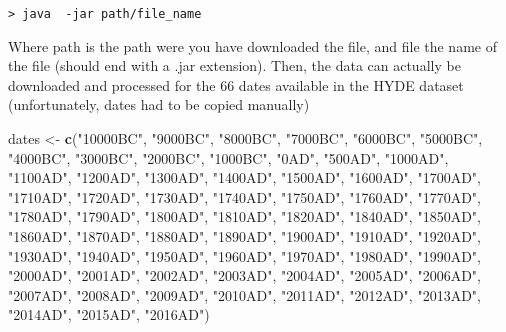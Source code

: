 \documentclass[]{article}
\newenvironment{Shaded}{\begin{snugshade}}{\end{snugshade}}
\newcommand{\KeywordTok}[1]{\textcolor[rgb]{0.13,0.29,0.53}{\textbf{#1}}}
\newcommand{\StringTok}[1]{\textcolor[rgb]{0.31,0.60,0.02}{#1}}
\newcommand{\NormalTok}[1]{#1}
\begin{document}
\texttt{\textgreater{}\ java\ \ -jar\ path/file\_name}

Where path is the path were you have downloaded the file, and file the
name of the file (should end with a .jar extension). Then, the data can
actually be downloaded and processed for the 66 dates available in the
HYDE dataset (unfortunately, dates had to be copied manually)

\begin{Shaded}
\begin{Highlighting}[]
\NormalTok{dates <-}\StringTok{ }\KeywordTok{c}\NormalTok{(}\StringTok{"10000BC"}\NormalTok{, }\StringTok{"9000BC"}\NormalTok{, }\StringTok{"8000BC"}\NormalTok{, }\StringTok{"7000BC"}\NormalTok{, }\StringTok{"6000BC"}\NormalTok{, }\StringTok{"5000BC"}\NormalTok{, }\StringTok{"4000BC"}\NormalTok{, }\StringTok{"3000BC"}\NormalTok{,}
           \StringTok{"2000BC"}\NormalTok{, }\StringTok{"1000BC"}\NormalTok{, }\StringTok{"0AD"}\NormalTok{, }\StringTok{"500AD"}\NormalTok{, }\StringTok{"1000AD"}\NormalTok{, }\StringTok{"1100AD"}\NormalTok{, }\StringTok{"1200AD"}\NormalTok{, }\StringTok{"1300AD"}\NormalTok{, }\StringTok{"1400AD"}\NormalTok{, }
           \StringTok{"1500AD"}\NormalTok{, }\StringTok{"1600AD"}\NormalTok{, }\StringTok{"1700AD"}\NormalTok{, }\StringTok{"1710AD"}\NormalTok{, }\StringTok{"1720AD"}\NormalTok{, }\StringTok{"1730AD"}\NormalTok{,   }\StringTok{"1740AD"}\NormalTok{, }\StringTok{"1750AD"}\NormalTok{, }
           \StringTok{"1760AD"}\NormalTok{, }\StringTok{"1770AD"}\NormalTok{, }\StringTok{"1780AD"}\NormalTok{, }\StringTok{"1790AD"}\NormalTok{, }\StringTok{"1800AD"}\NormalTok{, }\StringTok{"1810AD"}\NormalTok{, }\StringTok{"1820AD"}\NormalTok{, }\StringTok{"1840AD"}\NormalTok{, }
           \StringTok{"1850AD"}\NormalTok{, }\StringTok{"1860AD"}\NormalTok{, }\StringTok{"1870AD"}\NormalTok{, }\StringTok{"1880AD"}\NormalTok{, }\StringTok{"1890AD"}\NormalTok{, }\StringTok{"1900AD"}\NormalTok{, }\StringTok{"1910AD"}\NormalTok{, }\StringTok{"1920AD"}\NormalTok{, }
           \StringTok{"1930AD"}\NormalTok{, }\StringTok{"1940AD"}\NormalTok{, }\StringTok{"1950AD"}\NormalTok{, }\StringTok{"1960AD"}\NormalTok{, }\StringTok{"1970AD"}\NormalTok{, }\StringTok{"1980AD"}\NormalTok{, }\StringTok{"1990AD"}\NormalTok{, }\StringTok{"2000AD"}\NormalTok{, }
           \StringTok{"2001AD"}\NormalTok{, }\StringTok{"2002AD"}\NormalTok{, }\StringTok{"2003AD"}\NormalTok{, }\StringTok{"2004AD"}\NormalTok{, }\StringTok{"2005AD"}\NormalTok{, }\StringTok{"2006AD"}\NormalTok{, }\StringTok{"2007AD"}\NormalTok{, }\StringTok{"2008AD"}\NormalTok{, }
           \StringTok{"2009AD"}\NormalTok{, }\StringTok{"2010AD"}\NormalTok{, }\StringTok{"2011AD"}\NormalTok{, }\StringTok{"2012AD"}\NormalTok{, }\StringTok{"2013AD"}\NormalTok{, }\StringTok{"2014AD"}\NormalTok{, }\StringTok{"2015AD"}\NormalTok{, }\StringTok{"2016AD"}\NormalTok{)}


\end{Highlighting}
\end{Shaded}
\end{document}
